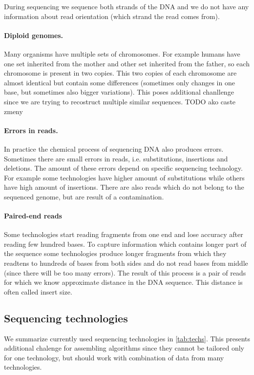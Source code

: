 During sequencing we sequence both strands of the DNA and we do not have
any information about read orientation (which strand the read comes from).

\paragraph{Diploid genomes.}
Many organisms have multiple sets of chromosomes. For example humans have one set
inherited from the mother and other set inherited from the father, so each chromosome
is present in two copies. This two copies of each chromosome are almost identical but
contain some differences (sometimes only changes in one base, but sometimes also
bigger variations). This poses additional chanllenge since we are trying to recostruct
multiple similar sequences.
TODO ako caste zmeny

\paragraph{Errors in reads.}
In practice the chemical process of sequencing DNA also produces errors.
Sometimes there are small errors in reads, i.e. substitutions, insertions
and deletions. The amount of these errors depend on specific sequencing technology.
For example some technologies have higher amount of substitutions while others
have high amount of insertions. 
There are also reads which do not belong to the sequenced genome, but are result
of a contamination.

\paragraph{Paired-end reads}
Some technologies start reading fragments from one end and lose accuracy after
reading few hundred bases. To capture information which contains longer part of the
sequence some technologies produce longer fragments from which they readtens to hundreds
of bases from both sides and do not read bases from middle (since there will be
too many errors). The result of this process is a pair of reads for which we know approximate
distance in the DNA sequence. This distance is often called insert size.

\subsection{Sequencing technologies}

We summarize currently used sequencing technologies in \ref{tab:techs}.
This presents additional chalenge for assembling algorithms since they
cannot be tailored only for one technology, but should work with combination
of data from many technologies.

